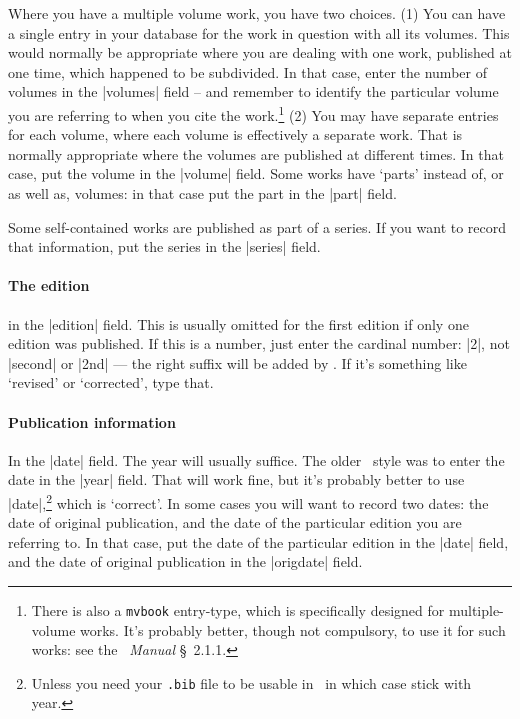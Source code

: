 Where you have a multiple volume work, you have two choices. (1) You
can have a single entry in your database for the work in question with
all its volumes. This would normally be appropriate where you are
dealing with one work, published at one time, which happened to be
subdivided. In that case, enter the number of volumes in the |volumes|
field -- and remember to identify the particular volume you are
referring to when you cite the work.\footnote{There is also a
  \texttt{mvbook} entry-type, which is specifically designed for
  multiple-volume works. It's probably better, though not compulsory,
  to use it for such works: see the \biblatex\ \emph{Manual}
  \S~2.1.1.} (2) You may have separate entries for each volume, where
each volume is effectively a separate work. That is normally
appropriate where the volumes are published at different times. In
that case, put the volume in the |volume| field. Some works have
`parts' instead of, or as well as, volumes: in that case put the part
in the |part| field.

Some self-contained works are published as part of a series. If you
want to record that information, put the series in the |series| field.

\paragraph{The edition} in the |edition| field. This is usually
omitted for the first edition if only one edition was published. If
this is a number, just enter the cardinal number: |{2}|, not |second|
or |2nd| --- the right suffix will be added by \biblatex. If it's
something like `revised' or `corrected', type that.

\paragraph{Publication information} 

In the |date| field. The year will usually suffice. The older \bibtex\
style was to enter the date in the |year| field. That will work fine,
but it's probably better to use |date|,\footnote{Unless you need your
  \texttt{.bib} file to be usable in \bibtex\, in which case stick
  with year.} which is `correct'. In some cases you will want to
record two dates: the date of original publication, and the date of
the particular edition you are referring to. In that case, put the
date of the particular edition in the |date| field, and the date of
original publication in the |origdate| field.

